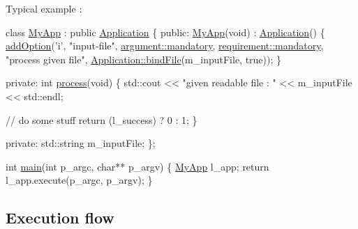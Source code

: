 Typical example \-: 
\begin{DoxyCodeInclude}
\textcolor{keyword}{class }\hyperlink{classMyApp}{MyApp} : \textcolor{keyword}{public} \hyperlink{classxtd_1_1Application_a2d911d40f42dc2928275538541b91633}{Application}
 \{
 \textcolor{keyword}{public}:
   \hyperlink{classMyApp}{MyApp}(\textcolor{keywordtype}{void}) :
     \hyperlink{classxtd_1_1Application_a2d911d40f42dc2928275538541b91633}{Application}()
   \{
     \hyperlink{classxtd_1_1Application_a7cea42a03984ceed3bae129ff9e1ef54}{addOption}(\textcolor{charliteral}{'i'}, \textcolor{stringliteral}{"input-file"},
               \hyperlink{classxtd_1_1Application_a672c075ed901e463609077d571a714c7ac5e3b9675d114c21ad3367d318f6aa95}{argument::mandatory},
               \hyperlink{classxtd_1_1Application_a49c0397e9fd22067e3a536443a17fe24ac5e3b9675d114c21ad3367d318f6aa95}{requirement::mandatory},
               \textcolor{stringliteral}{"process given file"},
               \hyperlink{classxtd_1_1Application_ab10f6dde0bf4034dff7eafe8a45c2029}{Application::bindFile}(m\_inputFile, \textcolor{keyword}{true}));
   \}

 \textcolor{keyword}{private}:
   \textcolor{keywordtype}{int} \hyperlink{classxtd_1_1Application_aef6043d47982bc1983a84e2c8a53f0cd}{process}(\textcolor{keywordtype}{void})
   \{
     std::cout << \textcolor{stringliteral}{"given readable file : "} << m\_inputFile << std::endl;

     \textcolor{comment}{// do some stuff}
     \textcolor{keywordflow}{return} (l\_success) ? 0 : 1;
   \}

 \textcolor{keyword}{private}:
   std::string m\_inputFile;
\};


\textcolor{keywordtype}{int} \hyperlink{main_8cc_af847876e048f60529674b0f221f6edc1}{main}(\textcolor{keywordtype}{int} p\_argc, \textcolor{keywordtype}{char}** p\_argv)
\{
  \hyperlink{classMyApp}{MyApp} l\_app;
  \textcolor{keywordflow}{return} l\_app.execute(p\_argc, p\_argv);
\}
\end{DoxyCodeInclude}
\hypertarget{classxtd_1_1Application_sec_execution_flow}{}\subsection{Execution flow}\label{classxtd_1_1Application_sec_execution_flow}
